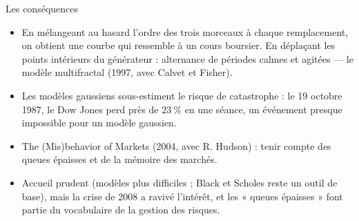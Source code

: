 \begin{frame}{Les conséquences}
  \small
  \begin{itemize}
    \item En mélangeant au hasard l'ordre des trois morceaux à chaque
      remplacement, on obtient une courbe qui ressemble à un cours
      boursier. En déplaçant les points intérieurs du générateur :
      alternance de périodes calmes et agitées --- le modèle
      multifractal (1997, avec Calvet et Fisher).
    \item Les modèles gaussiens sous-estiment le risque de catastrophe :
      le 19 octobre 1987, le Dow Jones perd près de $\SI{23}{\percent}$
      en une séance, un événement presque impossible pour un modèle
      gaussien.
    \item The (Mis)behavior of Markets (2004, avec R. Hudson) : tenir
      compte des queues épaisses et de la mémoire des marchés.
    \item Accueil prudent (modèles plus difficiles ; Black et Scholes
      reste un outil de base), mais la crise de 2008 a ravivé l'intérêt,
      et les « queues épaisses » font partie du vocabulaire de la gestion
      des risques.
  \end{itemize}
\end{frame}
